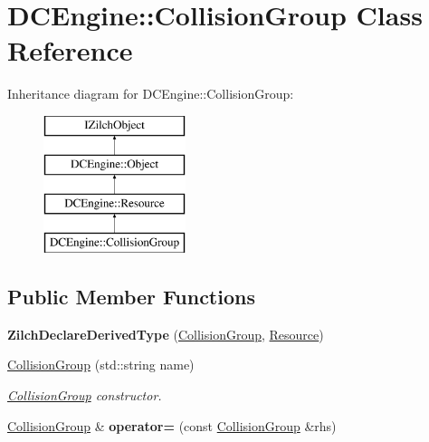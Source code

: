 \hypertarget{classDCEngine_1_1CollisionGroup}{\section{D\-C\-Engine\-:\-:Collision\-Group Class Reference}
\label{classDCEngine_1_1CollisionGroup}
}
Inheritance diagram for D\-C\-Engine\-:\-:Collision\-Group\-:\begin{figure}[H]
\begin{center}
\leavevmode
\includegraphics[height=4.000000cm]{classDCEngine_1_1CollisionGroup}
\end{center}
\end{figure}
\subsection*{Public Member Functions}
\begin{DoxyCompactItemize}
\item 
\hypertarget{classDCEngine_1_1CollisionGroup_adf82d868b8807935550230d9371c1d3c}{{\bfseries Zilch\-Declare\-Derived\-Type} (\hyperlink{classDCEngine_1_1CollisionGroup}{Collision\-Group}, \hyperlink{classDCEngine_1_1Resource}{Resource})}\label{classDCEngine_1_1CollisionGroup_adf82d868b8807935550230d9371c1d3c}

\item 
\hypertarget{classDCEngine_1_1CollisionGroup_a0b082f8e2eef665a4a64cd64ab2ace70}{\hyperlink{classDCEngine_1_1CollisionGroup_a0b082f8e2eef665a4a64cd64ab2ace70}{Collision\-Group} (std\-::string name)}\label{classDCEngine_1_1CollisionGroup_a0b082f8e2eef665a4a64cd64ab2ace70}

\begin{DoxyCompactList}\small\item\em \hyperlink{classDCEngine_1_1CollisionGroup}{Collision\-Group} constructor. \end{DoxyCompactList}\item 
\hypertarget{classDCEngine_1_1CollisionGroup_ad0f15f2c90e99ec60cdad4dd8d96b9b5}{\hyperlink{classDCEngine_1_1CollisionGroup}{Collision\-Group} \& {\bfseries operator=} (const \hyperlink{classDCEngine_1_1CollisionGroup}{Collision\-Group} \&rhs)}\label{classDCEngine_1_1CollisionGroup_ad0f15f2c90e99ec60cdad4dd8d96b9b5}

\end{DoxyCompactItemize}
